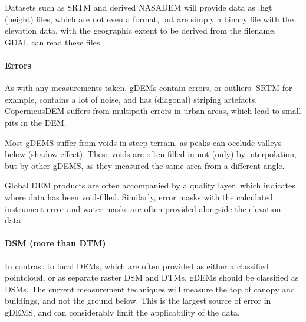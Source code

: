 Datasets such as SRTM and derived NASADEM will provide data as .hgt (height) files, which are not even a format, but are simply a binary file with the elevation data, with the geographic extent to be derived from the filename.
GDAL can read these files.


\paragraph{Errors}
As with any measurements taken, gDEMs contain errors, or outliers.
SRTM for example, contains a lot of noise, and has (diagonal) striping artefacts.
CopernicusDEM suffers from multipath errors in urban areas, which lead to small pits in the DEM.

Most gDEMS suffer from voids in steep terrain, as peaks can occlude valleys below (shadow effect).
These voids are often filled in not (only) by interpolation, but by other gDEMS, as they measured the same area from a different angle.


Global DEM products are often accompanied by a quality layer, which indicates where data has been void-filled.
Similarly, error masks with the calculated instrument error and water masks are often provided alongside the elevation data.





\paragraph{DSM (more than DTM)}
In contrast to local DEMs, which are often provided as either a classified pointcloud, or as separate raster DSM and DTMs, gDEMs should be classified as DSMs.
The current measurement techniques will measure the top of canopy and buildings, and not the ground below.
This is the largest source of error in gDEMS, and can considerably limit the applicability of the data.

